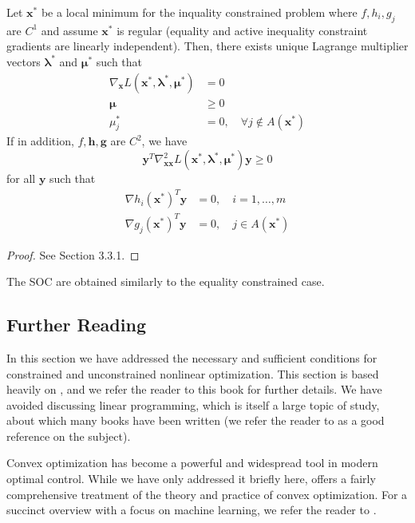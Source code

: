 \begin{theorem}
Let $\bm{x}^*$ be a local minimum for the inquality constrained problem where $f, h_i, g_j$ are $C^1$ and assume $\bm{x}^*$ is regular (equality and active inequality constraint gradients are linearly independent). Then, there exists unique Lagrange multiplier vectors $\bm{\lambda}^*$ and $\bm{\mu}^*$ such that
\begin{align}
    \nabla_{\bm{x}} L(\bm{x}^*,\bm{\lambda}^*, \bm{\mu}^*) &= 0\\
    \bm{\mu} &\geq 0\\
    \mu_j^* &= 0, \quad \forall j \notin A(\bm{x}^*)
\end{align}
If in addition, $f,\bm{h},\bm{g}$ are $C^2$, we have 
\begin{equation}
    \bm{y}^T \nabla^2_{\bm{xx}} L(\bm{x}^*,\bm{\lambda}^*, \bm{\mu}^*) \bm{y} \geq 0 
\end{equation}
for all $\bm{y}$ such that 
\begin{align}
    \nabla h_i(\bm{x}^*)^T \bm{y} &=0, \quad i = 1, \ldots, m\\
    \nabla g_j(\bm{x}^*)^T \bm{y} &=0, \quad j \in A(\bm{x}^*)
\end{align}
\end{theorem}

\begin{proof}
See \cite{bertsekas2016nonlinear} Section 3.3.1.
\end{proof}

The SOC are obtained similarly to the equality constrained case. 



\subsection{Further Reading}

In this section we have addressed the necessary and sufficient conditions for constrained and unconstrained nonlinear optimization. This section is based heavily on \cite{bertsekas2016nonlinear}, and we refer the reader to this book for further details. We have avoided discussing linear programming, which is itself a large topic of study, about which many books have been written (we refer the reader to \cite{bertsimas1997introduction} as a good reference on the subject). 

Convex optimization has become a powerful and widespread tool in modern optimal control. While we have only addressed it briefly here, \cite{boyd2004convex} offers a fairly comprehensive treatment of the theory and practice of convex optimization. For a succinct overview with a focus on machine learning, we refer the reader to \cite{kolter2008convex}.
